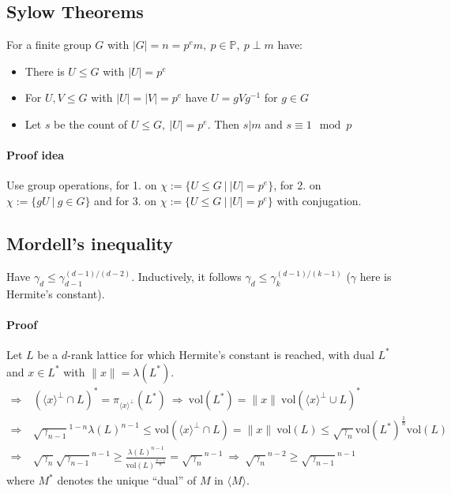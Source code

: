 \documentclass{scrartcl}
\newcommand{\vol}{\mathrm{vol}}
\begin{document}
\subsection{Sylow Theorems}

For a finite group $G$ with $|G| = n = p^em, \ p \in \mathbb{P}, \ p \perp m$ have:
\begin{itemize}
    \item There is $U \leq G$ with $|U| = p^e$
    \item For $U, V \leq G$ with $|U| = |V| = p^e$ have $U = gVg^{-1}$ for $g \in G$
    \item Let $s$ be the count of $U \leq G, \ |U| = p^e$. Then $s | m$ and $s \equiv 1 \mod p$
\end{itemize}

\paragraph{Proof idea} Use group operations, for 1. on $\chi := \{ U \leq G \ | \ |U| = p^e \}$, for 2. on $\chi := \{ gU \ | \ g \in G \}$ and for 3. on $\chi := \{ U \leq G \ | \ |U| = p^e \}$ with conjugation.

\subsection{Mordell's inequality}
Have $\gamma_d \leq \gamma_{d-1}^{(d - 1) / (d - 2)}$. Inductively, it follows $\gamma_d \leq \gamma_k^{(d-1)/(k-1)}$ ($\gamma$ here is Hermite's constant).
\paragraph{Proof} Let $L$ be a $d$-rank lattice for which Hermite's constant is reached, with dual $L^*$ and $x \in L^*$ with $\|x\| = \lambda(L^*)$.
\begin{equation}
    \begin{split}
        \Rightarrow& \ \left(\langle x \rangle ^\perp \cap L\right)^* = \pi_{\langle x \rangle ^\perp} (L^*) \ \Rightarrow \ \vol(L^*) = \|x\| \ \vol\left(\langle x \rangle^\perp \cup L\right)^* \\
        \Rightarrow& \ \sqrt{\gamma_{n-1}}^{1-n} \lambda(L)^{n-1} \leq \vol\left(\langle x \rangle^\perp \cap L\right) = \|x\| \ \vol(L) \leq \sqrt{\gamma_n} \vol(L^*)^{\frac 1 n} \vol(L) \\
        \Rightarrow& \ \sqrt{\gamma_n} \sqrt{\gamma_{n - 1}}^{n - 1} \geq \frac {\lambda(L)^{n-1}} {\vol(L)^{\frac {n-1} n}} = \sqrt{\gamma_n}^{n-1} \ \Rightarrow \ \sqrt{\gamma_n}^{n-2} \geq \sqrt{\gamma_{n-1}}^{n-1}
    \end{split} \nonumber
\end{equation}
where $M^*$ denotes the unique ``dual'' of $M$ in $\langle M \rangle$.
\end{document}
